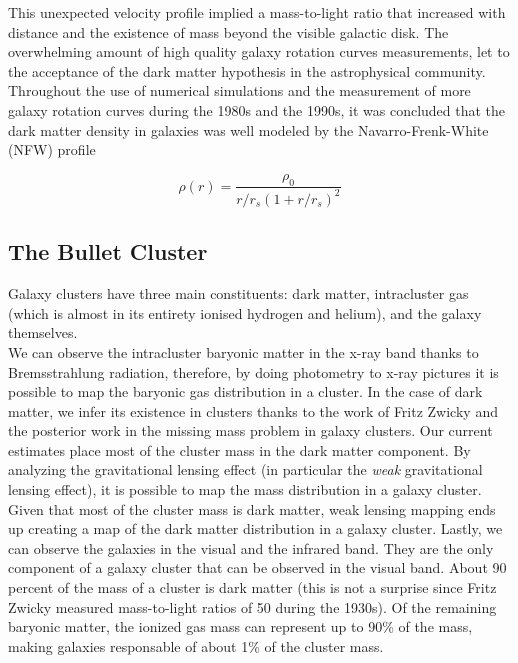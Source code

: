 This unexpected velocity profile implied a mass-to-light ratio that increased with distance and the existence of mass beyond the visible galactic disk\cite{theIsMassOutside}.
The overwhelming amount of high quality galaxy rotation curves measurements, let to the acceptance of the dark matter hypothesis in the astrophysical community.\\

Throughout the use of numerical simulations and the measurement of more galaxy rotation curves during the 1980s and the 1990s, it was concluded that the dark matter density in galaxies was well modeled by the Navarro-Frenk-White (NFW) profile\cite{FWN}\cite{mariangela}

\begin{equation}
\rho(r) = \frac{\rho_0}{r/r_s(1+r/r_s)^2}
\end{equation}


\subsection{The Bullet Cluster}
Galaxy clusters have three main constituents: dark matter, intracluster gas (which is almost in its entirety ionised hydrogen and helium), and the galaxy themselves.\cite{book:75345}\\


We can observe the intracluster baryonic matter in the x-ray band thanks to Bremsstrahlung radiation, therefore, by doing photometry to x-ray pictures it is possible to map the baryonic gas distribution in a cluster.
In the case of dark matter, we infer its existence in clusters thanks to the work of Fritz Zwicky and the posterior work in the missing mass problem in galaxy clusters.
Our current estimates place most of the cluster mass in the dark matter component.
By analyzing the gravitational lensing effect (in particular the \emph{weak} gravitational lensing effect), it is possible to map the mass distribution in a galaxy cluster. 
Given that most of the cluster mass is dark matter, weak lensing mapping ends up creating a map of the dark matter distribution in a galaxy cluster.
Lastly, we can observe the galaxies in the visual and the infrared band.
They are the only component of a galaxy cluster that can be observed in the visual band.
About 90 percent of the mass of a cluster is dark matter (this is not a surprise since Fritz Zwicky measured mass-to-light ratios of 50 during the 1930s). Of the remaining baryonic matter, the ionized gas mass can represent up to 90\% of the mass, making galaxies responsable of about 1\% of the cluster mass.\\


